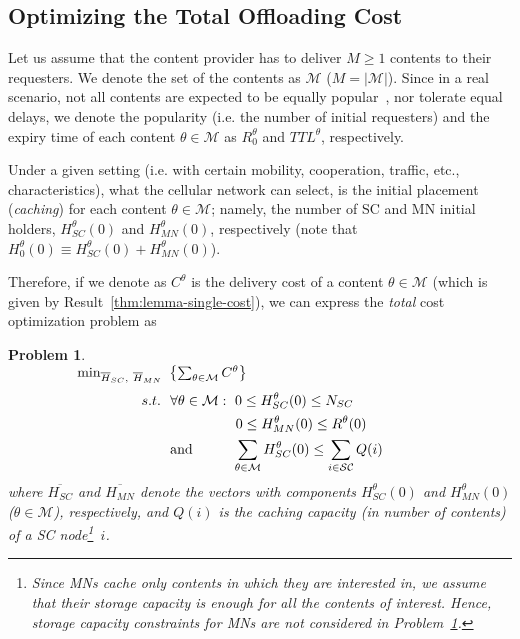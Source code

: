 \documentclass[10pt,conference,letterpaper]{IEEEtran}
\newtheorem{problem}{Problem}
\begin{document}
\subsection{Optimizing the Total Offloading Cost}\label{sec:optimizing-total-cost}
Let us assume that the content provider has to deliver $M\geq1$ contents to their requesters. We denote the set of the contents as $\mathcal{M}$ ($M=|\mathcal{M}|$).  Since in a real scenario, not all contents are expected to be equally popular~\cite{youtube-traffic-from-edge,top-video-cellular,pptv-mobile-vod}, nor tolerate equal delays, we denote the popularity (i.e. the number of initial requesters) and the expiry time of each content $\theta\in\mathcal{M}$ as $R_{0}^{\theta}$ and $TTL^{\theta}$, respectively.

Under a given setting (i.e. with certain mobility, cooperation, traffic, etc., characteristics), what the cellular network can select, is the initial placement (\textit{caching}) for each content $\theta\in\mathcal{M}$; namely, the number of SC and MN initial holders, $H_{SC}^{\theta}(0)$ and $H_{MN}^{\theta}(0)$, respectively (note that $H_{0}^{\theta}(0)\equiv H_{SC}^{\theta}(0)+H_{MN}^{\theta}(0)$).

Therefore, if we denote as $C^{\theta}$ is the delivery cost of a content $\theta\in\mathcal{M}$ (which is given by Result~\ref{thm:lemma-single-cost}), we can express the \textit{total} cost optimization problem as
\begin{problem}\label{eq:optimization-problem-multi}~\\
$~\hspace{1.6cm}\min_{\overline{H}_{SC},~\overline{H}_{MN}}~\left\{\sum_{\theta\in\mathcal{M}} C^{\theta}\right\}$
\begin{align*}
~s.t.~~&\forall\theta\in\mathcal{M}:~  0\leq H_{SC}^{\theta}(0)\leq N_{SC}\\
&\hspace{1.65cm} 0\leq H_{MN}^{\theta}(0)\leq R^{\theta}(0)\\
&\text{and}\hspace{1cm }\sum_{\theta\in\mathcal{M}}H_{SC}^{\theta}(0)\leq \sum_{i\in\mathcal{SC}} Q(i)\end{align*}
where $\overline{H_{SC}}$ and $\overline{H_{MN}}$ denote the vectors with components $H_{SC}^{\theta}(0)$ and $H_{MN}^{\theta}(0)$ ($\theta\in\mathcal{M}$), respectively, and $Q(i)$ is the caching capacity (in number of contents) of a SC node\footnote{Since MNs cache only contents in which they are interested in, we assume that their storage capacity is enough for all the contents of interest. Hence, storage capacity constraints for MNs are not considered in Problem~\ref{eq:optimization-problem-multi}.}~$i$.\end{problem}
\end{document}
